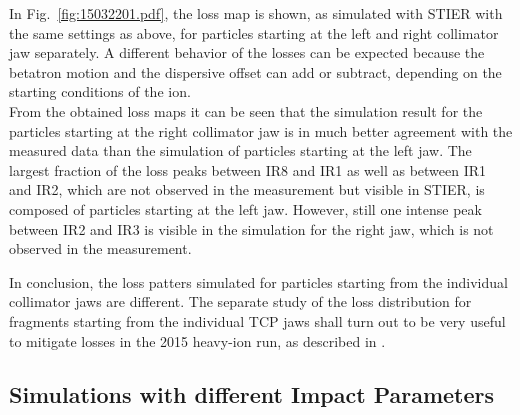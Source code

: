 In Fig.~\ref{fig:15032201.pdf}, the loss map is shown, as simulated with STIER with the same settings as above, for particles starting at the left and right collimator jaw separately. A different behavior of the losses can be expected because the betatron motion and the dispersive offset can add or subtract, depending on the starting conditions of the ion.
\\
From the obtained loss maps it can be seen that the simulation result for the particles starting at the right collimator jaw is in much better agreement with the measured data than the simulation of particles starting at the left jaw. The largest fraction of the loss peaks between IR8 and IR1 as well as between IR1 and IR2, which are not observed in the measurement but visible in STIER, is composed of particles starting at the left jaw. However, still one intense peak between IR2 and IR3 is visible in the simulation for the right jaw, which is not observed in the measurement. 

In conclusion, the loss patters simulated for particles starting from the individual collimator jaws are different. The separate study of the loss distribution for fragments starting from the individual TCP jaws shall turn out to be very useful to mitigate losses in the 2015 heavy-ion run, as described in .


\subsection{Simulations with different Impact Parameters} \label{subsec:impactparam}

